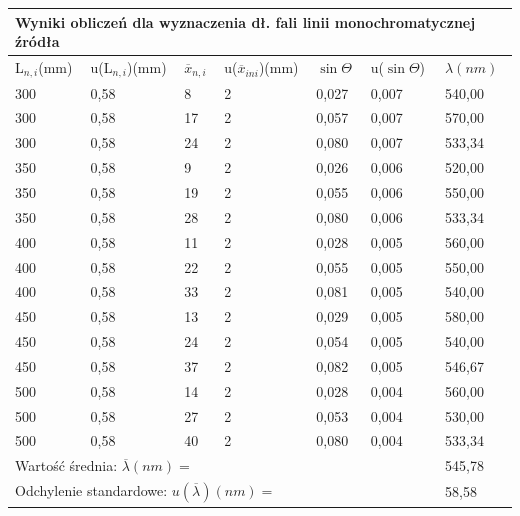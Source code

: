 \documentclass[12pt]{article}
\begin{document}
\begin{table}[!ht]
    \centering
    \begin{tabular}{|l|l|l|l|l|l|l|}
    \hline
    \multicolumn{7}{|l|}{Wyniki obliczeń dla wyznaczenia dł. fali linii monochromatycznej źródła} \\
    \hline
        L$_{n,i}$(mm) & u(L$_{n,i}$)(mm) & $\overline{x}_{n,i}$ & u($\overline{x}_{ini}$)(mm) & $\sin \Theta$ & u($\sin \Theta$) & $\lambda(nm)$ \\ \hline
        300 & 0,58 & 8 & 2 & 0,027 & 0,007 & 540,00 \\ \hline
        300 & 0,58 & 17 & 2 & 0,057 & 0,007 & 570,00 \\ \hline
        300 & 0,58 & 24 & 2 & 0,080 & 0,007 & 533,34 \\ \hline
        350 & 0,58 & 9 & 2 & 0,026 & 0,006 & 520,00 \\ \hline
        350 & 0,58 & 19 & 2 & 0,055 & 0,006 & 550,00 \\ \hline
        350 & 0,58 & 28 & 2 & 0,080 & 0,006 & 533,34 \\ \hline
        400 & 0,58 & 11 & 2 & 0,028 & 0,005 & 560,00 \\ \hline
        400 & 0,58 & 22 & 2 & 0,055 & 0,005 & 550,00 \\ \hline
        400 & 0,58 & 33 & 2 & 0,081 & 0,005 & 540,00 \\ \hline
        450 & 0,58 & 13 & 2 & 0,029 & 0,005 & 580,00 \\ \hline
        450 & 0,58 & 24 & 2 & 0,054 & 0,005 & 540,00 \\ \hline
        450 & 0,58 & 37 & 2 & 0,082 & 0,005 & 546,67 \\ \hline
        500 & 0,58 & 14 & 2 & 0,028 & 0,004 & 560,00 \\ \hline
        500 & 0,58 & 27 & 2 & 0,053 & 0,004 & 530,00 \\ \hline
        500 & 0,58 & 40 & 2 & 0,080 & 0,004 & 533,34 \\ \hline
        \multicolumn{6}{|l|}{Wartość średnia: $\overline{\lambda}(nm)=$} & 545,78 \\ \hline
        \multicolumn{6}{|l|}{Odchylenie standardowe: $u(\overline{\lambda})(nm)=$} & 58,58 \\ \hline
    \end{tabular}
\end{table}
\end{document}
